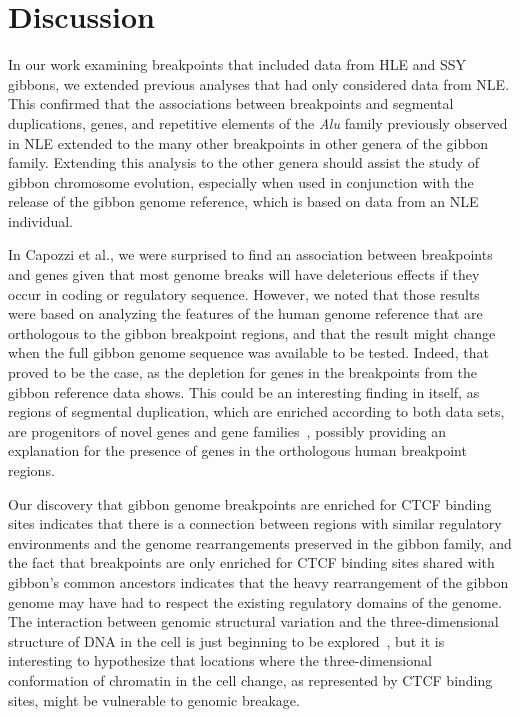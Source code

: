 
\section{Discussion}

In our work examining breakpoints that included data from HLE and SSY gibbons, we extended previous analyses that had only considered data from NLE. This confirmed that the associations between breakpoints and segmental duplications, genes, and repetitive elements of the \emph{Alu} family previously observed in NLE extended to the many other breakpoints in other genera of the gibbon family. Extending this analysis to the other genera should assist the study of gibbon chromosome evolution, especially when used in conjunction with the release of the gibbon genome reference, which is based on data from an NLE individual.

In Capozzi et al.\cite{Capozzi:2012bb}, we were surprised to find an association between breakpoints and genes given that most genome breaks will have deleterious effects if they occur in coding or regulatory sequence. However, we noted that those results were based on analyzing the features of the human genome reference that are orthologous to the gibbon breakpoint regions, and that the result might change when the full gibbon genome sequence was available to be tested. Indeed, that proved to be the case, as the depletion for genes in the breakpoints from the gibbon reference data shows. This could be an interesting finding in itself, as regions of segmental duplication, which are enriched according to both data sets, are progenitors of novel genes and gene families~\cite{Bailey:2006fn}, possibly providing an explanation for the presence of genes in the orthologous human breakpoint regions.

Our discovery that gibbon genome breakpoints are enriched for CTCF binding sites indicates that there is a connection between regions with similar regulatory environments and the genome rearrangements preserved in the gibbon family, and the fact that breakpoints are only enriched for CTCF binding sites shared with gibbon's common ancestors indicates that the heavy rearrangement of the gibbon genome may have had to respect the existing regulatory domains of the genome. The interaction between genomic structural variation and the three-dimensional structure of DNA in the cell is just beginning to be explored~\cite{Dixon:2012gc}, but it is interesting to hypothesize that locations where the three-dimensional conformation of chromatin in the cell change, as represented by CTCF binding sites, might be vulnerable to genomic breakage.